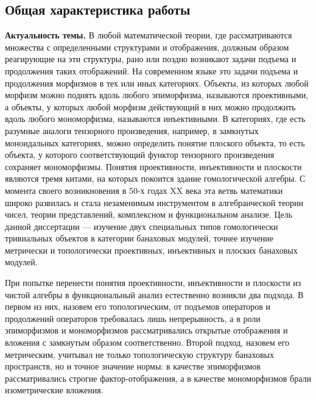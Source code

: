 \subsection*{\Large Общая характеристика работы}
\fontsize{14pt}{15pt}\selectfont

\textbf{Актуальность темы.} В любой математической теории, где рассматриваются
множества с определенными структурами и отображения, должным образом реагирующие
на эти структуры, рано или поздно возникают задачи подъема и продолжения таких
отображений. На современном языке это задачи подъема и продолжения морфизмов в
тех или иных категориях. Объекты, из которых любой морфизм можно поднять вдоль
любого эпиморфизма, называются проективными, а объекты, у которых любой морфизм
действующий в них можно продолжить вдоль любого мономорфизма, называются
инъективными. В категориях, где есть разумные аналоги тензорного произведения,
например, в замкнутых моноидальных категориях, можно определить понятие плоского
объекта, то есть объекта, у которого соответствующий функтор тензорного
произведения сохраняет мономорфизмы. Понятия проективности, инъективности и
плоскости являются тремя китами, на которых покоится здание гомологической
алгебры. С момента своего возникновения в 50-х годах XX века эта ветвь
математики широко развилась и стала незаменимым инструментом в алгебраической
теории чисел, теории представлений, комплексном и функциональном анализе. Цель
данной диссертации --- изучение двух специальных типов гомологически тривиальных
объектов в категории банаховых модулей, точнее изучение метрически и
топологически проективных, инъективных и плоских банаховых модулей.

При попытке перенести понятия проективности, инъективности и плоскости из чистой
алгебры в функциональный анализ естественно возникли два подхода. В первом из
них, назовем его топологическим, от подъемов операторов и продолжений операторов
требовалась лишь непрерывность, а в роли эпиморфизмов и мономорфизмов
рассматривались открытые отображения и вложения с замкнутым образом
соответственно. Второй подход, назовем его метрическим, учитывал не только
топологическую структуру банаховых пространств, но и точное значение нормы: в
качестве эпиморфизмов рассматривались строгие фактор-отображения, а в качестве
мономорфизмов брали изометрические вложения.

